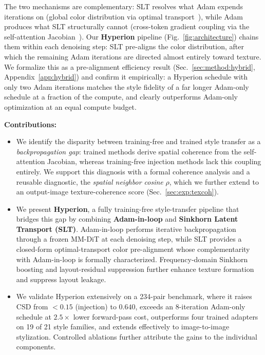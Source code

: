 The two mechanisms are complementary: SLT resolves what Adam
expends iterations on
(global color distribution via optimal
transport~\cite{villani2009optimal,haviv2025wasserstein}), while Adam produces
what SLT structurally cannot (cross-token gradient coupling via the
self-attention Jacobian~\cite{vaswani2017attention}).
Our \textbf{Hyperion} pipeline (Fig.~\ref{fig:architecture}) chains them within
each denoising step: SLT pre-aligns the color distribution, after which the
remaining Adam iterations are directed almost entirely toward texture.
We formalize this as a pre-alignment efficiency result
(Sec.~\ref{sec:method:hybrid}, Appendix~\ref{app:hybrid}) and confirm it
empirically: a Hyperion schedule with only two Adam iterations matches the
style fidelity of a far longer Adam-only schedule at a fraction of the
compute, and clearly outperforms Adam-only optimization at an equal compute
budget.

\noindent\textbf{Contributions:}
\begin{itemize}[leftmargin=1.4em, itemsep=1pt, topsep=2pt]
  \item We identify the disparity between training-free and trained style
  transfer as a \emph{backpropagation gap}: trained methods derive spatial
  coherence from the self-attention Jacobian, whereas training-free injection
  methods lack this coupling entirely. We support this diagnosis with a formal
  coherence analysis and a reusable diagnostic, the \emph{spatial neighbor
  cosine} $\rho$, which we further extend to an output-image
  texture-coherence score (Sec.~\ref{sec:exp:texcoh}).
  \item We present \textbf{Hyperion}, a fully training-free style-transfer
  pipeline that bridges this gap by combining \textbf{Adam-in-loop} and
  \textbf{Sinkhorn Latent Transport (SLT)}. Adam-in-loop performs iterative
  backpropagation through a frozen MM-DiT at each denoising step, while SLT
  provides a closed-form optimal-transport color pre-alignment whose
  complementarity with Adam-in-loop is formally characterized.
  Frequency-domain Sinkhorn boosting and layout-residual suppression further
  enhance texture formation and suppress layout leakage.
  \item We validate Hyperion extensively on a 234-pair benchmark, where it
  raises CSD from $<0.15$ (injection) to $0.640$, exceeds an 8-iteration
  Adam-only schedule at $2.5\times$ lower forward-pass cost, outperforms four
  trained adapters on 19 of 21 style families, and extends effectively to
  image-to-image stylization. Controlled ablations further attribute the gains
  to the individual components.
\end{itemize}
